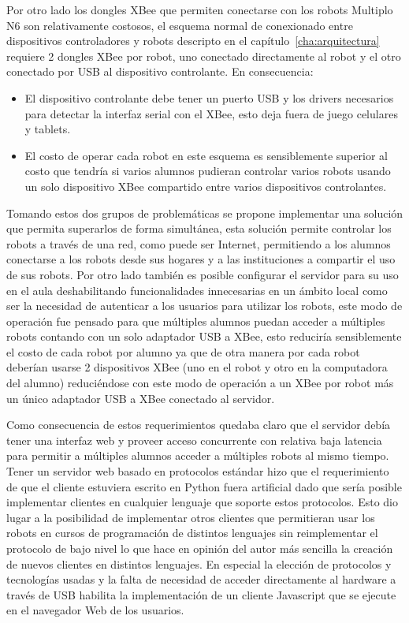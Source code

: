 Por otro lado los dongles XBee que permiten conectarse con los robots
Multiplo N6
son relativamente costosos, el esquema normal de conexionado entre dispositivos
controladores y robots descripto en el capítulo~\ref{cha:arquitectura} requiere
2 dongles XBee por robot, uno conectado directamente al robot y el otro
conectado por USB al dispositivo controlante. En consecuencia:
\begin{itemize}
    \item El dispositivo controlante debe tener un puerto USB y los drivers
        necesarios para detectar la interfaz serial con el XBee, esto deja
        fuera de juego celulares y tablets.
    \item El costo de operar cada robot en este esquema es sensiblemente
        superior al costo que tendría si varios alumnos pudieran
        controlar varios robots usando un solo dispositivo XBee compartido
        entre varios dispositivos controlantes.
\end{itemize}

Tomando estos dos grupos de problemáticas se propone implementar una solución
que permita
superarlos de forma simultánea, esta solución permite controlar los
robots a través de una red, como puede ser Internet, permitiendo a los alumnos
conectarse a los robots desde sus hogares y a las instituciones a compartir
el uso de sus robots. Por otro lado también es posible configurar el servidor
para su uso en el aula deshabilitando funcionalidades innecesarias en un ámbito
local como ser la necesidad de autenticar a los usuarios para utilizar los
robots, este modo de operación fue pensado para que múltiples alumnos puedan
acceder a múltiples robots contando con un solo adaptador USB a XBee, esto
reduciría sensiblemente el costo de cada robot por alumno ya que de otra
manera por cada robot deberían usarse 2 dispositivos XBee (uno en el robot
y otro en la computadora del alumno) reduciéndose con este modo de operación
a un XBee por robot más un único adaptador USB a XBee conectado al servidor.

Como consecuencia de estos requerimientos quedaba claro que el servidor
debía tener una interfaz web y proveer acceso concurrente con relativa
baja latencia para permitir a múltiples alumnos acceder a múltiples robots
al mismo tiempo. Tener un servidor web basado en protocolos estándar hizo
que el requerimiento de que el cliente estuviera escrito en Python fuera
artificial dado que sería posible implementar clientes en cualquier lenguaje
que soporte estos protocolos. Esto dio lugar a la posibilidad de
implementar otros clientes que permitieran usar los robots en cursos
de programación de distintos lenguajes sin reimplementar el protocolo
de bajo nivel lo que hace en opinión del autor más sencilla la creación
de nuevos clientes en distintos lenguajes.
En especial la elección de protocolos y tecnologías usadas
y la falta de necesidad de acceder directamente al hardware a través de USB
habilita la implementación de un cliente Javascript que se ejecute en el
navegador Web de los usuarios.


